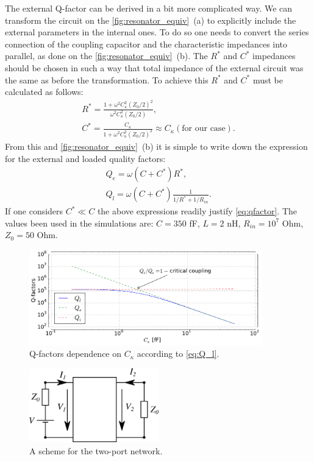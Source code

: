 \documentclass[12pt]{report}
\numberwithin{equation}{section}
\begin{document}
The external Q-factor can be derived in a bit more complicated way\cite{Goppl2008}. We can transform the circuit on the \autoref{fig:resonator_equiv}~(a) to explicitly include the external parameters in the internal ones. To do so one needs to convert the series connection of the coupling capacitor and the characteristic impedances into parallel, as done on the \autoref{fig:resonator_equiv}~(b). The $R^*$ and $C^*$ impedances should be chosen in such a way that total impedance of the external circuit was the same as before the transformation. To achieve this $R^*$ and $C^*$ must be calculated as follows:
\begin{gather}
R^{*} = \frac{1+\omega^2 C_\kappa^2 (Z_0/2)^2}{\omega^2 C_\kappa^2 (Z_0/2)	}, \\
C^{*} = \frac{C_\kappa}{1+\omega^2 C_\kappa^2 (Z_0/2)^2} \approx C_\kappa (\text{for our case}). \label{eq:C_ast}
\end{gather}
From this and \autoref{fig:resonator_equiv}~(b) it is simple to write down the expression for the external and loaded quality factors:
\begin{gather}
Q_e = \omega (C+C^{*}) R^{*}, \\
Q_l = \omega (C+C^{*})  \frac{1}{1/R^{*}+1/R_{in}}. \label{eq:Q_l}
\end{gather}
If one considers $C^{*} \ll C$ the above expressions readily justify \eqref{eq:qfactor}. The values been used in the simulations are: $C = 350$ fF, $L = 2$ nH, $R_{in}=10^7$ Ohm, $Z_0 = 50$ Ohm.

\begin{figure}
\centering
\includegraphics[width=0.9\textwidth]{q-factors}
\caption{Q-factors dependence on $C_\kappa$ according to \eqref{eq:Q_l}.}
\end{figure}



\begin{figure}
\centering
\includegraphics[width=0.5\textwidth]{tl_scheme_general}
\caption{A scheme for the two-port network.}
\label{fgeneral2port}
\end{figure}
\end{document}
